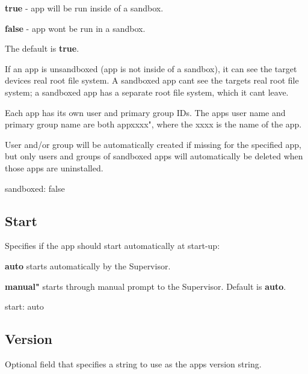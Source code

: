\begin{DoxyItemize}
\item {\bfseries true} -\/ app will be run inside of a sandbox.
\item {\bfseries false} -\/ app won\textquotesingle{}t be run in a sandbox.
\end{DoxyItemize}

The default is {\bfseries true}.

If an app is unsandboxed (app is not inside of a sandbox), it can see the target device\textquotesingle{}s real root file system. A sandboxed app can\textquotesingle{}t see the target\textquotesingle{}s real root file system; a sandboxed app has a separate root file system, which it can\textquotesingle{}t leave.

Each app has its own user and primary group I\+Ds. The app\textquotesingle{}s user name and primary group name are both {\ttfamily appxxxx"}, where the {\ttfamily xxxx} is the name of the app.

User and/or group will be automatically created if missing for the specified app, but only users and groups of sandboxed apps will automatically be deleted when those apps are uninstalled.

\begin{DoxyVerb}sandboxed: false
\end{DoxyVerb}
\hypertarget{def_files_adef_defFilesAdef_start}{}\subsection{Start}\label{def_files_adef_defFilesAdef_start}
Specifies if the app should start automatically at start-\/up\+:
\begin{DoxyItemize}
\item {\bfseries auto} starts automatically by the Supervisor.
\item {\bfseries manual"} starts through manual prompt to the Supervisor. Default is {\bfseries auto}.
\end{DoxyItemize}

\begin{DoxyVerb}start: auto
\end{DoxyVerb}
\hypertarget{def_files_adef_defFilesAdef_version}{}\subsection{Version}\label{def_files_adef_defFilesAdef_version}
Optional field that specifies a string to use as the app\textquotesingle{}s version string.

